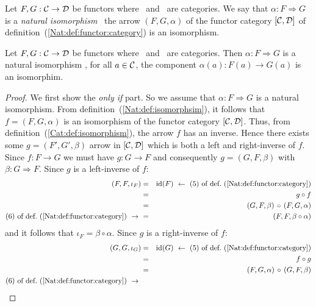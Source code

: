 \begin{defin}\label{Nat:def:isomorphsim}
    Let $F,G:\mbox{$\cal C$}\to\mbox{$\cal D$}$ be functors where \Cat\ and \Dat\ are categories.
    We say that $\alpha:F\Rightarrow G$ is a {\em natural isomorphism} 
    \ifand\ the arrow $(F,G,\alpha)$ of the functor category
    $[\mbox{$\cal C$},\mbox{$\cal D$}]$ of definition~(\ref{Nat:def:functor:category}) 
    is an isomorphism.
\end{defin}

\begin{prop}\label{Nat:prop:isomorphism}
    Let $F,G:\mbox{$\cal C$}\to\mbox{$\cal D$}$ be functors where \Cat\ and \Dat\ are categories.
    Then $\alpha:F\Rightarrow G$ is a natural isomorphism \ifand, for
    all $a\in\mbox{$\cal C$}$, the component $\alpha(a):F(a)\to G(a)$ is an
    isomorphim.
\end{prop}
\begin{proof}
    We first show the {\em only if} part. So we assume that 
    $\alpha:F\Rightarrow G$ is a natural isomorphism. From 
    definition~(\ref{Nat:def:isomorphsim}), it follows that
    $f=(F,G,\alpha)$ is an isomorphism of the functor category
    $[\mbox{$\cal C$},\mbox{$\cal D$}]$. Thus, from definition~(\ref{Cat:def:isomorphism}), 
    the arrow $f$ has an inverse. Hence there exists some
    $g=(F',G',\beta)$ arrow in $[\mbox{$\cal C$},\mbox{$\cal D$}]$ which is both a left and
    right-inverse of $f$. Since $f:F\to G$ we must have $g:G\to F$ and
    consequently $g=(G,F,\beta)$ with $\beta:G\Rightarrow F$. Since $g$ 
    is a left-inverse of $f$: 
        \begin{eqnarray*}(F,F,\iota_{F})
            &=&\id(F)\ \leftarrow\ 
            \mbox{$(5)$ of def.~(\ref{Nat:def:functor:category})}\\
            &=&g\circ f\\
            &=&(G,F,\beta)\,\circ\,(F,G,\alpha)\\
            \mbox{$(6)$ of def.~(\ref{Nat:def:functor:category})}\ \to\ 
            &=&(F,F,\beta\circ\alpha)
        \end{eqnarray*}
    and it follows that $\iota_{F}=\beta\circ\alpha$. Since $g$ is
    a right-inverse of $f$:
        \begin{eqnarray*}(G,G,\iota_{G})
            &=&\id(G)\ \leftarrow\ 
            \mbox{$(5)$ of def.~(\ref{Nat:def:functor:category})}\\
            &=&f\circ g\\
            &=&(F,G,\alpha)\,\circ\,(G,F,\beta)\\
            \mbox{$(6)$ of def.~(\ref{Nat:def:functor:category})}\ \to\ 

\end{eqnarray*}
\end{proof}
